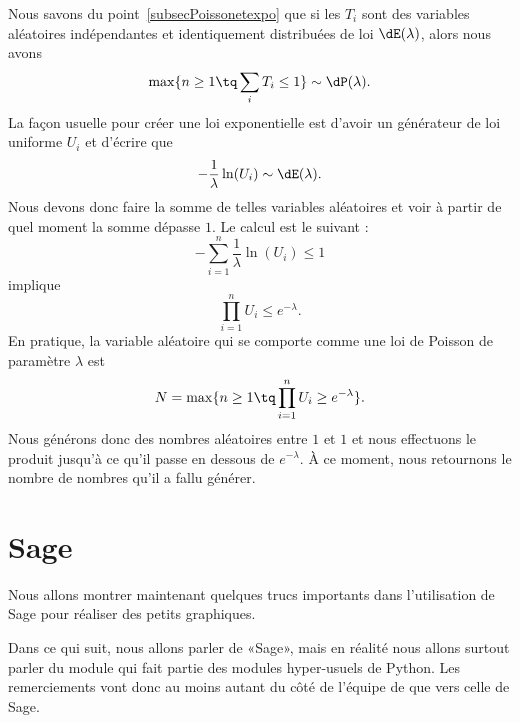 Nous savons du point~\ref{subsecPoissonetexpo} que si les \( T_i\) sont des variables aléatoires indépendantes et identiquement distribuées de loi \( \dE(\lambda)\), alors nous avons
\begin{equation}
	\max\{ n\geq 1\tq\sum_iT_i\leq 1 \}\sim\dP(\lambda).
\end{equation}
La façon usuelle pour créer une loi exponentielle est d'avoir un générateur de loi uniforme \( U_i\) et d'écrire que
\begin{equation}
	-\frac{1}{ \lambda }\ln(U_i)\sim \dE(\lambda).
\end{equation}
Nous devons donc faire la somme de telles variables aléatoires et voir à partir de quel moment la somme dépasse \( 1\). Le calcul est le suivant :
\begin{equation}
	-\sum_{i=1}^{n}\frac{1}{ \lambda }\ln(U_i)\leq 1
\end{equation}
implique
\begin{equation}
	\prod_{i=1}^nU_i\leq  e^{-\lambda}.
\end{equation}
En pratique, la variable aléatoire qui se comporte comme une loi de Poisson de paramètre \( \lambda\) est
\begin{equation}
	N=\max\{ n\geq 1\tq \prod_{i=1}^nU_i\geq e^{-\lambda} \}.
\end{equation}
Nous générons donc des nombres aléatoires entre \( 1\) et \( 1\) et nous effectuons le produit jusqu'à ce qu'il passe en dessous de \(  e^{-\lambda}\). À ce moment, nous retournons le nombre de nombres qu'il a fallu générer.

\section{Sage}

Nous allons montrer maintenant quelques trucs importants dans l'utilisation de Sage pour réaliser des petits graphiques.

\begin{remark}
	Dans ce qui suit, nous allons parler de «Sage», mais en réalité nous allons surtout parler du module  qui fait partie des modules hyper-usuels de Python. Les remerciements vont donc au moins autant du côté de l'équipe de  que vers celle de Sage.
\end{remark}

